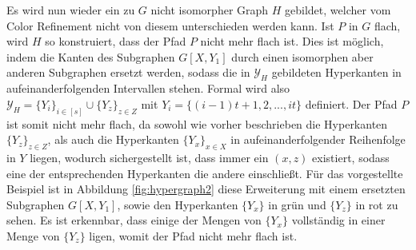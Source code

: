 Es wird nun wieder ein zu $G$ nicht isomorpher Graph $H$ gebildet, welcher vom Color Refinement nicht von diesem unterschieden werden kann.
Ist $P$ in $G$ flach, wird $H$ so konstruiert, dass der Pfad $P$ nicht mehr flach ist.
Dies ist möglich, indem die Kanten des Subgraphen $G[X,Y_1]$ durch einen isomorphen aber anderen Subgraphen ersetzt werden, sodass die in $\mathcal{Y}_H$ gebildeten Hyperkanten in aufeinanderfolgenden Intervallen stehen.
Formal wird also $\mathcal{Y}_H=\{Y_i\}_{i\in [s]}\cup \{Y_z\}_{z\in Z}$ mit $Y_i=\{(i-1)t+1,2,...,it\}$ definiert.
Der Pfad $P$ ist somit nicht mehr flach, da sowohl wie vorher beschrieben die Hyperkanten $\{Y_z\}_{z\in Z}$, als auch die Hyperkanten $\{Y_x\}_{x\in X}$ in aufeinanderfolgender Reihenfolge in $Y$ liegen, wodurch sichergestellt ist, dass immer ein $(x,z)$ existiert, sodass eine der entsprechenden Hyperkanten die andere einschließt.
Für das vorgestellte Beispiel ist in Abbildung \ref{fig:hypergraph2} diese Erweiterung mit einem ersetzten Subgraphen $G[X,Y_1]$, sowie den Hyperkanten $\{Y_x\}$ in grün und $\{Y_z\}$ in rot zu sehen.
Es ist erkennbar, dass einige der Mengen von $\{Y_x\}$ vollständig in einer Menge von $\{Y_z\}$ ligen, womit der Pfad nicht mehr flach ist.


